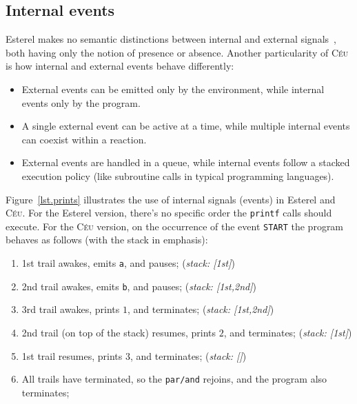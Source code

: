 \documentclass{acm_proc_article-sp}
\newcommand{\CEU}{\textsc{C\'{e}u}\xspace}
\newcommand{\code}[1] {{\small{\texttt{#1}}}}
\newcommand{\1}{\;}
\newcommand{\2}{\;\;}
\newcommand{\3}{\;\;\;}
\newcommand{\5}{\;\;\;\;\;}
\begin{document}


\subsection{Internal events}
\label{sec.ceu.ints}

Esterel makes no semantic distinctions between internal and external 
signals~\cite{esterel.preemption}, both having only the notion of presence or
absence.
%
Another particularity of \CEU is how internal and external events behave 
differently:

\begin{itemize}
\item External events can be emitted only by the environment, while internal 
events only by the program.
\item A single external event can be active at a time, while multiple internal 
events can coexist within a reaction.
\item External events are handled in a queue, while internal events follow a 
stacked execution policy (like subroutine calls in typical programming 
languages).
\end{itemize}

Figure~\ref{lst.prints} illustrates the use of internal signals (events) in 
Esterel and \CEU.
%
For the Esterel version, there's no specific order the \code{printf} calls 
should execute.
%
For the \CEU version, on the occurrence of the event \code{START} the program 
behaves as follows (with the stack in emphasis):
%
{\small
\begin{enumerate}
\setlength{\itemsep}{0pt}
\item 1st trail awakes, emits \code{a}, and pauses;
    (\emph{stack: [1st]})
\item 2nd trail awakes, emits \code{b}, and pauses;
    (\emph{stack: [1st,2nd]})
\item 3rd trail awakes, prints $1$, and terminates;
    (\emph{stack: [1st,2nd]})
\item 2nd trail (on top of the stack) resumes, prints $2$, and terminates;
    (\emph{stack: [1st]})
\item 1st trail resumes, prints $3$, and terminates;
    (\emph{stack: []})
\item All trails have terminated, so the \code{par/and} rejoins, and the 
program also terminates;
\end{enumerate}
}
\end{document}
